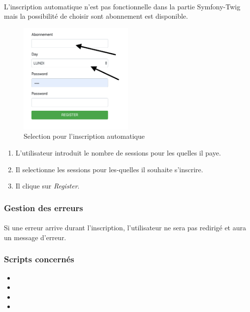 \paragraph{}
	L'inscription automatique n'est pas fonctionnelle dans la partie Symfony-Twig mais la possibilité de choisir sont abonnement est disponible. 

\begin{figure}[h]
	\includegraphics[width=0.5\textwidth,center]{Figures/us4-1}
	\caption{Selection pour l'inscription automatique}
\end{figure}

\begin{enumerate}
	\item L'utilisateur introduit le nombre de sessions pour les quelles il paye.
	\item Il selectionne les sessions pour les-quelles il souhaite s'inscrire.
	\item Il clique sur \textit{Register}.
\end{enumerate}

\subsubsection{Gestion des erreurs}
	\paragraph{}
		Si une erreur arrive durant l'inscription, l'utilisateur ne sera pas redirigé et aura un message d'erreur. 
	
\subsubsection{Scripts concernés}
	\begin{itemize}
		\item {}
		\item {}
		\item {}
		\item {}
	\end{itemize}

